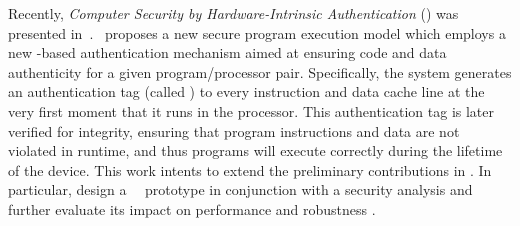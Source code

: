 Recently, \textit{Computer Security by Hardware-Intrinsic Authentication} (\system) was presented in~\cite{Hoffman2015}. \system~proposes a new secure program execution model which employs a new \puf-based authentication mechanism aimed at ensuring code and data authenticity for a given program\slash{}processor pair. Specifically, the system generates an authentication tag (called \ptag) to every instruction and data cache line at the very first moment that it runs in the processor. This authentication tag is later verified for integrity, ensuring that program instructions and data are not violated in runtime, and thus programs will execute correctly during the lifetime of the device. This work  intents to extend the preliminary contributions in \cite{Hoffman2015}. In particular, design a \cshia~\fpga~prototype in conjunction with a security analysis and further evaluate its impact on performance and robustness . 
